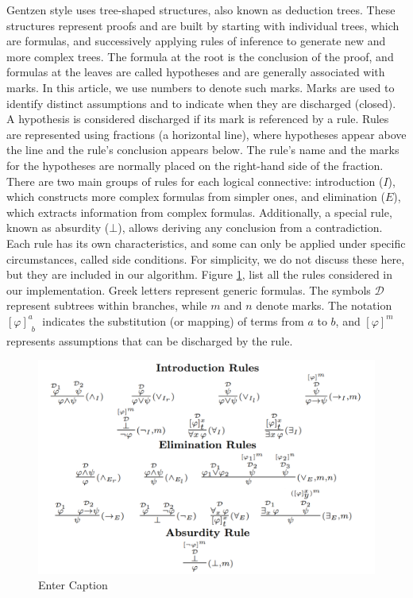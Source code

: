 \documentclass[runningheads]{llncs}
\begin{document}
Gentzen style uses tree-shaped structures, also known as deduction trees. These structures represent proofs and are built by starting with individual trees, which are formulas, and successively applying rules of inference to generate new and more complex trees. The formula at the root is the conclusion of the proof, and formulas at the leaves are called hypotheses and are generally associated with marks. In this article, we use numbers to denote such marks. Marks are used to identify distinct assumptions and to indicate when they are discharged (closed). A hypothesis is considered discharged if its mark is referenced by a rule. Rules are represented using fractions (a horizontal line), where hypotheses appear above the line and the rule’s conclusion appears below. The rule’s name and the marks for the hypotheses are normally placed on the right-hand side of the fraction. There are two main groups of rules for each logical connective: introduction (\(I\)), which constructs more complex formulas from simpler ones, and elimination (\(E\)), which extracts information from complex formulas. Additionally, a special rule, known as absurdity (\(\bot\)), allows deriving any conclusion from a contradiction. Each rule has its own characteristics,
and some can only be applied under specific circumstances, called side conditions. For simplicity, we do not discuss these here, but they are included in our algorithm. Figure \ref{fig:nd-rules}, list all the rules considered in our implementation. Greek letters represent generic formulas. The symbols \( \mathcal{D} \) represent subtrees within branches, while \( m \) and \( n \) denote marks. The notation \(\displaystyle \left[ \varphi \right]^a_{\substack{b}}\) indicates the substitution (or mapping) of terms from \( a \) to \( b \), and \(\displaystyle [\varphi]^m\) represents assumptions that can be discharged by the rule.
\vspace{-1em}
\begin{figure}[H]
    \centering
    \includegraphics[width=0.97\linewidth]{resources/rules.png}
    \caption{Enter Caption}
    \label{fig:nd-rules}
\end{figure}
\end{document}
